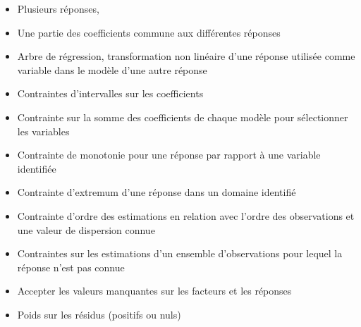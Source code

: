 \documentclass{article}
\begin{document}
\begin{itemize}
	\item Plusieurs réponses, 
	\item Une partie des coefficients commune aux différentes réponses
	\item Arbre de régression, transformation non linéaire d'une réponse utilisée comme variable dans le modèle d'une autre réponse
	\item Contraintes d'intervalles sur les coefficients
	\item Contrainte sur la somme des coefficients de chaque modèle pour sélectionner les variables
	\item Contrainte de monotonie pour une réponse par rapport à une variable identifiée
	\item Contrainte d'extremum d'une réponse dans un domaine identifié
	\item Contrainte d'ordre des estimations en relation avec l'ordre des observations et une valeur de dispersion connue
	\item Contraintes sur les estimations d'un ensemble d'observations pour lequel la réponse n'est pas connue
	\item Accepter les valeurs manquantes sur les facteurs et les réponses
	\item Poids sur les résidus (positifs ou nuls)
\end{itemize}
\end{document}
